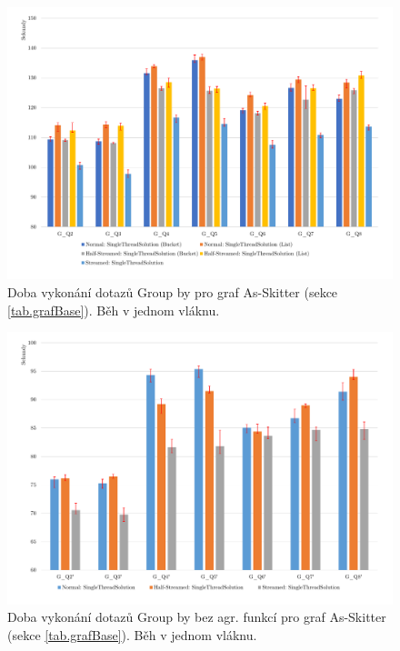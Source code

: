 \begin{figure}[!htp]
\includegraphics[width=\linewidth]{../img/skitterGroupByST.pdf}\centering
\caption{Doba vykonání dotazů Group by pro graf As-Skitter (sekce \ref{tab.grafBase}). Běh v jednom vláknu.}
\label{figure.skitterGroupByST}
\end{figure}
\begin{figure}[!htp]
\includegraphics[width=\linewidth]{../img/skitterGroupBySTNoAgg.pdf}\centering
\caption{Doba vykonání dotazů Group by bez agr. funkcí pro graf As-Skitter (sekce \ref{tab.grafBase}). Běh v jednom vláknu.}
\label{figure.skitterGroupBySTNoAgg}
\end{figure}



\clearpage

